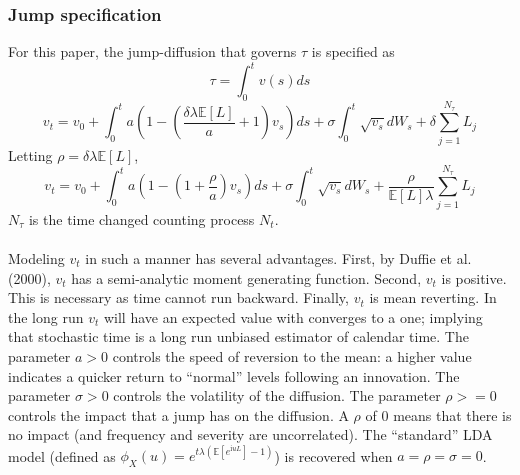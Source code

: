 \documentclass{article}
\theoremstyle{definition}
\begin{document}
\subsubsection{Jump specification}
For this paper, the jump-diffusion that governs \(\tau\) is specified as 
\begin{equation}\tau=\int_0 ^ t v(s)ds\end{equation}
\begin{equation}v_t=v_0+\int_0 ^t a\left(1-\left(\frac{\delta \lambda \mathbb{E}[L]}{a}+1\right)v_s\right)ds+\sigma \int_0 ^ t \sqrt{v_s} dW_s +\delta \sum_{j=1} ^ {N_\tau} L_j \end{equation}
 Letting \(\rho=\delta \lambda \mathbb{E}[L]\),
\begin{equation}\label{tmc}v_t=v_0+\int_0 ^t a\left(1-\left(1+\frac{\rho}{a}\right)v_s\right)ds+\sigma \int_0 ^ t \sqrt{v_s} dW_s +\frac{\rho}{\mathbb{E}[L]\lambda} \sum_{j=1} ^ {N_\tau} L_j \end{equation}
\(N_\tau\) is the time changed counting process \(N_t\).
\\
\\
Modeling \(v_t\) in such a manner has several advantages.  First, by Duffie et al. (2000), \(v_t\) has a semi-analytic moment generating function.  Second, \(v_t\) is positive.  This is necessary as time cannot run backward.  Finally, \(v_t\) is mean reverting.  In the long run \(v_t\) will have an expected value with converges to a one; implying that stochastic time is a long run unbiased estimator of calendar time.  The parameter \(a>0\) controls the speed of reversion to the mean: a higher value indicates a quicker return to ``normal'' levels following an innovation.  The parameter \(\sigma>0\) controls the volatility of the diffusion.  The parameter \(\rho>=0\) controls the impact that a jump has on the diffusion.  A \(\rho\) of \(0\) means that there is no impact (and frequency and severity are uncorrelated).  The ``standard'' LDA model (defined as \(\phi_X(u)=e^{t\lambda \left(\mathbb{E}\left[e^{\mathrm{i}uL}\right]-1\right)}\)) is recovered when \(a=\rho=\sigma=0\).
\end{document}
